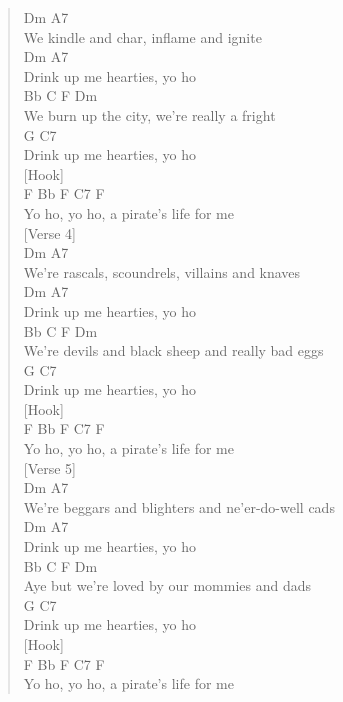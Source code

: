 \documentclass[11pt]{article}
\begin{document}
\begin{verse}
Dm                  A7\\
We kindle and char, inflame and ignite\\
Dm                       A7\\
Drink up me hearties, yo ho\\
\hspace*{3em}Bb          C           F        Dm\\
We burn up the city, we're really a fright\\
\hspace*{6em}G                  C7\\
Drink up me hearties, yo ho\\
\vspace*{1em}
[Hook]\\
F      Bb       F        C7        F\\
Yo ho, yo ho, a pirate's life for me\\
\vspace*{1em}
[Verse 4]\\
\hspace*{6em}Dm                   A7\\
We're rascals, scoundrels, villains and knaves\\
Dm                       A7\\
Drink up me hearties, yo ho\\
\hspace*{6em}Bb         C               F          Dm\\
We're devils and black sheep and really bad eggs\\
\hspace*{6em}G                  C7\\
Drink up me hearties, yo ho\\
\vspace*{1em}
[Hook]\\
F      Bb       F        C7       F\\
Yo ho, yo ho, a pirate's life for me\\
\vspace*{1em}
[Verse 5]\\
\hspace*{6em}Dm                        A7\\
We're beggars and blighters and ne'er-do-well cads\\
Dm                       A7\\
Drink up me hearties, yo ho\\
Bb            C            F           Dm\\
Aye but we're loved by our mommies and dads\\
G                        C7\\
Drink up me hearties, yo ho\\
\vspace*{1em}
[Hook]\\
F      Bb       F        C7        F\\
Yo ho, yo ho, a pirate's life for me\\
\end{verse}
\clearpage
\end{document}
